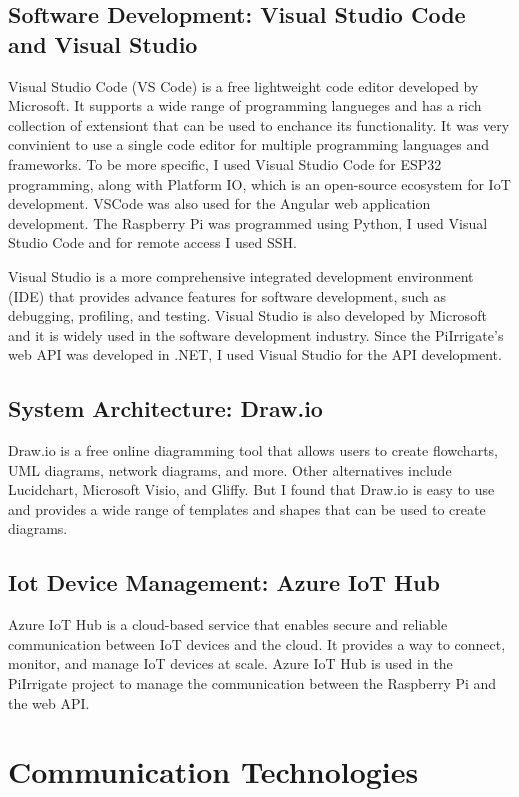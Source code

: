 \subsection{Software Development: Visual Studio Code and Visual Studio}
Visual Studio Code (VS Code) is a free lightweight code editor developed by Microsoft.
It supports a wide range of programming langueges and has a rich collection of extensiont that can be used to 
enchance its functionality.
It was very convinient to use a single code editor for multiple programming languages and frameworks.
To be more specific, I used Visual Studio Code for ESP32 programming, along with Platform IO, 
which is an open-source ecosystem for IoT development. VSCode was also used for the Angular web application 
development. The Raspberry Pi was programmed using Python, I used Visual Studio Code and for remote access
I used SSH.

Visual Studio is a more comprehensive integrated development environment (IDE) that provides advance features
for software development, such as debugging, profiling, and testing.
Visual Studio is also developed by Microsoft and it is widely used in the software development industry.
Since the PiIrrigate's web API was developed in .NET, I used Visual Studio for the API development.

\subsection{System Architecture: Draw.io}
Draw.io is a free online diagramming tool that allows users to create flowcharts, 
UML diagrams, network diagrams, and more. 
Other alternatives include Lucidchart, Microsoft Visio, and Gliffy. But I found that Draw.io is easy to use
and provides a wide range of templates and shapes that can be used to create diagrams.

\subsection{Iot Device Management: Azure IoT Hub}
Azure IoT Hub is a cloud-based service that enables secure and reliable 
communication between IoT devices and the cloud.
It provides a way to connect, monitor, and manage IoT devices at scale.
Azure IoT Hub is used in the PiIrrigate project to manage the
communication between the Raspberry Pi and the web API.

\section{Communication Technologies}
